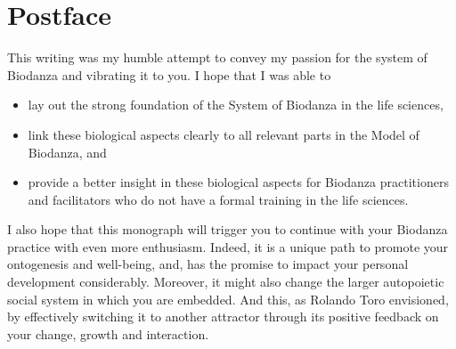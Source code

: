 \documentclass[
  11pt,
]{book}
\providecommand{\tightlist}{%
  \setlength{\itemsep}{0pt}\setlength{\parskip}{0pt}}
\begin{document}
\newpage

\hypertarget{postface}{%
\chapter*{Postface}\label{postface}}

This writing was my humble attempt to convey my passion for the system of Biodanza and vibrating it to you. I hope that I was able to

\begin{itemize}
\tightlist
\item
  lay out the strong foundation of the System of Biodanza in the life sciences,
\item
  link these biological aspects clearly to all relevant parts in the Model of Biodanza, and
\item
  provide a better insight in these biological aspects for Biodanza practitioners and facilitators who do not have a formal training in the life sciences.
\end{itemize}

I also hope that this monograph will trigger you to continue with your Biodanza practice with even more enthusiasm. Indeed, it is a unique path to promote your ontogenesis and well-being, and, has the promise to impact your personal development considerably. Moreover, it might also change the larger autopoietic social system in which you are embedded. And this, as Rolando Toro envisioned, by effectively switching it to another attractor through its positive feedback on your change, growth and interaction.

  
\end{document}
